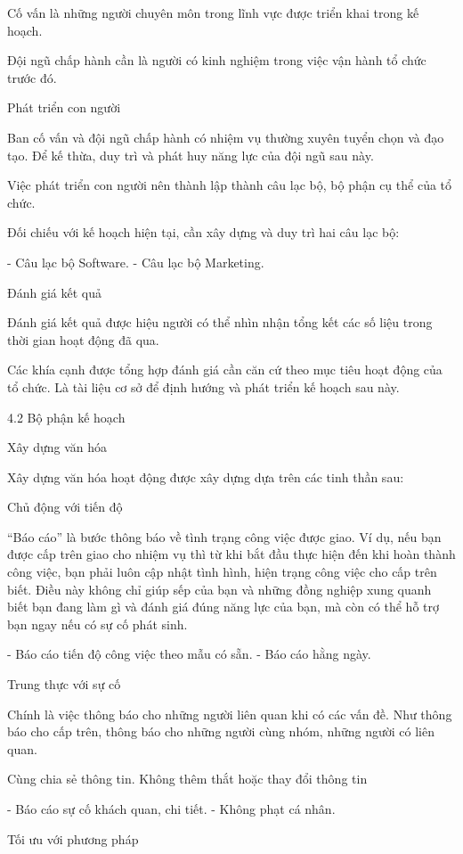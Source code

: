 \documentclass{report}
\begin{document}
Cố vấn là những người chuyên môn trong lĩnh vực được triển khai trong kế hoạch.

Đội ngũ chấp hành cần là người có kinh nghiệm trong việc vận hành tổ chức trước đó.

Phát triển con người

Ban cố vấn và đội ngũ chấp hành có nhiệm vụ thường xuyên tuyển chọn và đạo tạo. Để kế thừa, duy trì và phát huy năng lực
của đội ngũ sau này.

Việc phát triển con người nên thành lập thành câu lạc bộ, bộ phận cụ thể của tổ chức.

Đối chiếu với kế hoạch hiện tại, cần xây dựng và duy trì hai câu lạc bộ:

- Câu lạc bộ Software.
- Câu lạc bộ Marketing.

Đánh giá kết quả

Đánh giá kết quả được hiệu người có thể nhìn nhận tổng kết các số liệu trong thời gian hoạt động đã qua.

Các khía cạnh được tổng hợp đánh giá cần căn cứ theo mục tiêu hoạt động của tổ chức. Là tài liệu cơ sở để định hướng và
phát triển kế hoạch sau này.

4.2 Bộ phận kế hoạch

Xây dựng văn hóa

Xây dựng văn hóa hoạt động được xây dựng dựa trên các tinh thần sau:

Chủ động với tiến độ

“Báo cáo” là bước thông báo về tình trạng công việc được giao. Ví dụ, nếu bạn được cấp trên giao cho nhiệm vụ thì từ khi
bắt đầu thực hiện đến khi hoàn thành công việc, bạn phải luôn cập nhật tình hình, hiện trạng công việc cho cấp trên
biết. Điều này không chỉ giúp sếp của bạn và những đồng nghiệp xung quanh biết bạn đang làm gì và đánh giá đúng năng lực
của bạn, mà còn có thể hỗ trợ bạn ngay nếu có sự cố phát sinh.

- Báo cáo tiến độ công việc theo mẫu có sẵn.
- Báo cáo hằng ngày.

Trung thực với sự cố

Chính là việc thông báo cho những người liên quan khi có các vấn đề. Như thông báo cho cấp trên, thông báo cho những
người cùng nhóm, những người có liên quan.

Cùng chia sẻ thông tin. Không thêm thắt hoặc thay đổi thông tin

- Báo cáo sự cố khách quan, chi tiết.
- Không phạt cá nhân.

Tối ưu với phương pháp
\end{document}
